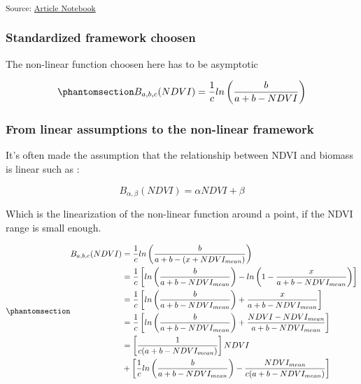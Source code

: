 \documentclass[
  letterpaper,
  DIV=11,
  numbers=noendperiod]{scrartcl}
\begin{document}
\renewcommand*{\arraystretch}{1}

\textsubscript{Source:
\href{https://AugustinDebly.github.io/CSI_Annee_2/index.qmd.html}{Article
Notebook}}

\subsubsection{Standardized framework
choosen}\label{standardized-framework-choosen}

The non-linear function choosen here has to be asymptotic

\begin{equation}\phantomsection\label{eq-NDVIB}{
B_{a,b,c}(NDVI) = \frac{1}{c}ln\left(\frac{b}{a+b-NDVI}\right)
}\end{equation}

\subsubsection{From linear assumptions to the non-linear
framework}\label{from-linear-assumptions-to-the-non-linear-framework}

It's often made the assumption that the relationship between NDVI and
biomass is linear such as :

\[
B_{\alpha,\beta}(NDVI) = \alpha NDVI + \beta
\]

Which is the linearization of the non-linear function around a point, if
the NDVI range is small enough.

\begin{equation}\phantomsection\label{eq-linearNDVIB}{
\begin{aligned}
    B_{a,b,c}(NDVI) &= \frac{1}{c}ln\left(\frac{b}{a+b-(x+NDVI_{mean})}\right)\\
    &= \frac{1}{c}\left[ln\left(\frac{b}{a+b-NDVI_{mean}}\right)-ln\left(1-\frac{x}{a+b-NDVI_{mean}}\right)\right]\\
    &= \frac{1}{c}\left[ln\left(\frac{b}{a+b-NDVI_{mean}}\right)+\frac{x}{a+b-NDVI_{mean}}\right]\\
    &= \frac{1}{c}\left[ln\left(\frac{b}{a+b-NDVI_{mean}}\right)+\frac{NDVI - NDVI_{mean}}{a+b-NDVI_{mean}}\right]\\
    &= \left[\frac{1}{c(a+b-NDVI_{mean})}\right]NDVI\\&+\left[\frac{1}{c}ln\left(\frac{b}{a+b-NDVI_{mean}}\right)-\frac{NDVI_{mean}}{c(a+b-NDVI_{mean})}\right]\\
\end{aligned}
}\end{equation}
\end{document}
